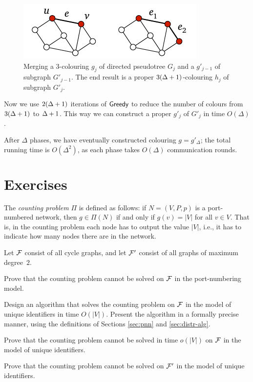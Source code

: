 \begin{figure}
    \centering
    \includegraphics[page=\PMergeColours]{figs.pdf}
    \caption{Merging a $3$-colouring $g_j$ of directed pseudotree $G_j$ and a \Dpocol{} $g'_{j-1}$ of subgraph $G'_{j-1}$. The end result is a proper $3(\Delta\nobreak +1)$-colouring $h_j$ of subgraph $G'_j$.}\label{fig:merge-colours}
\end{figure}

Now we use $2(\Delta+\nobreak 1)$ iterations of $\textsf{Greedy}$ to reduce the number of colours from $3(\Delta+\nobreak 1)$ to $\Delta+\nobreak 1$. This way we can construct a proper \Dpocol{} $g'_j$ of $G'_j$ in time $O(\Delta)$.

After $\Delta$ phases, we have eventually constructed colouring $g = g'_\Delta$; the total running time is $O(\Delta^2)$, as each phase takes $O(\Delta)$ communication rounds.


\section{Exercises}

\begin{ex}[counting]
    The \emph{counting problem} $\Pi$ is defined as follows: if $N = (V,P,p)$ is a port-numbered network, then $g \in \Pi(N)$ if and only if $g(v) = |V|$ for all $v \in V$. That is, in the counting problem each node has to output the value $|V|$, i.e., it has to indicate how many nodes there are in the network.
    
    Let $\mathcal{F}$ consist of all cycle graphs, and let $\mathcal{F}'$ consist of all graphs of maximum degree~$2$.
    \begin{subex}
        \item Prove that the counting problem cannot be solved on $\mathcal{F}$ in the port-numbering model.
        \item Design an algorithm that solves the counting problem on $\mathcal{F}$ in the model of unique identifiers in time $O(|V|)$. Present the algorithm in a formally precise manner, using the definitions of Sections \ref{sec:pnn} and \ref{sec:distr-alg}.
        \item Prove that the counting problem cannot be solved in time $o(|V|)$ on $\mathcal{F}$ in the model of unique identifiers.
        \item Prove that the counting problem cannot be solved on $\mathcal{F}'$ in the model of unique identifiers.
    \end{subex}
\end{ex}

